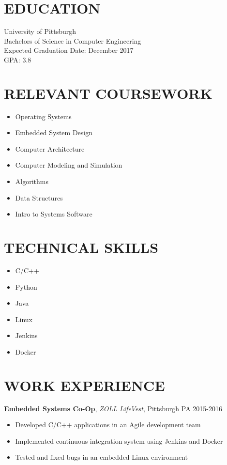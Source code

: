 \documentclass[line, margin]{res}
\begin{document}
\address{3136 Colony Lane \\ Plymouth Meeting, PA 19462 \\ (484) 866-6792}

\begin{resume}

    \section{EDUCATION}
    University of Pittsburgh \\
    Bachelors of Science in Computer Engineering \\
    Expected Graduation Date: December 2017 \\
    GPA: 3.8

    \section{RELEVANT COURSEWORK}
    \begin{itemize}
        \item Operating Systems
        \item Embedded System Design
        \item Computer Architecture
        \item Computer Modeling and Simulation
        \item Algorithms
        \item Data Structures
        \item Intro to Systems Software
    \end{itemize}

    \section{TECHNICAL SKILLS}
    \begin{itemize}
        \item C/C++
        \item Python
        \item Java
        \item Linux
        \item Jenkins
        \item Docker
    \end{itemize}

    \section{WORK EXPERIENCE}
    \textbf{Embedded Systems Co-Op}, \textit{ZOLL LifeVest}, Pittsburgh PA  \hfill 2015-2016 \\
    \begin{itemize}
        \item Developed C/C++ applications in an Agile development team
        \item Implemented continuous integration system using Jenkins and Docker
        \item Tested and fixed bugs in an embedded Linux environment
    \end{itemize}


\end{resume}
\end{document}
